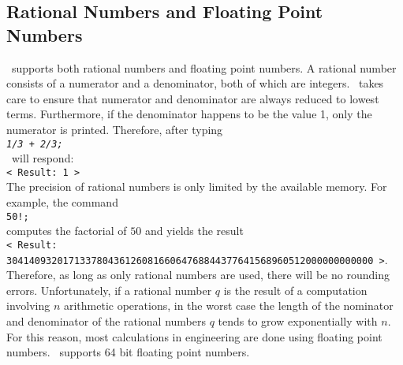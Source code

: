 \subsection{Rational Numbers and Floating Point Numbers}
\setlx\ supports both rational numbers and floating point numbers.
A rational number consists of a numerator and a denominator, both of which are integers.  \setlx\ takes care to
ensure that numerator and denominator are always reduced to lowest terms.  Furthermore, if the
denominator happens to be the value 1, only the numerator is printed.  Therefore, after typing
\\[0.2cm]
\hspace*{1.3cm}
\texttt{\textsl{1/3 + 2/3;}}
\\[0.2cm]
\setlx\ will respond:
\\[0.2cm]
\hspace*{1.3cm}
\texttt{< Result: 1 >}
\\[0.2cm]
The precision of rational numbers is only limited by the available memory.  For example, the command
\\[0.2cm]
\hspace*{1.3cm}
\texttt{50!;}
\\[0.2cm]
computes the factorial of $50$ and yields the result
\\[0.2cm]
\hspace*{0.1cm}
\texttt{< Result: 30414093201713378043612608166064768844377641568960512000000000000 >}.
\\[0.2cm]
Therefore, as long as only rational numbers are used, there will be no rounding errors.
Unfortunately, if a rational number $q$ is the result of a computation involving $n$ arithmetic
operations, in the worst case the length of the nominator and denominator of the rational numbers
$q$ tends to grow exponentially with $n$.  For this reason, most calculations in engineering are
done using floating point numbers.  \setlx\ supports 64 bit floating point numbers.

